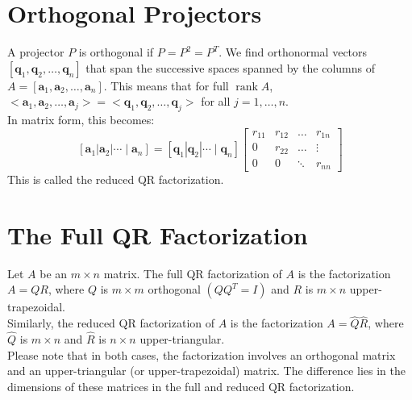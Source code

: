 \documentclass[11pt]{book}
\begin{document}
\section*{Orthogonal Projectors}
A projector $P$ is orthogonal if $P=P^{2}=P^{T}$. We find orthonormal vectors $\left[\mathbf{q}_{1}, \mathbf{q}_{2}, \ldots, \mathbf{q}_{n}\right]$ that span the successive spaces spanned by the columns of $A=\left[\mathbf{a}_{1}, \mathbf{a}_{2}, \ldots, \mathbf{a}_{n}\right]$. This means that for full $\operatorname{rank} A$, $<\mathbf{a}_{1}, \mathbf{a}_{2}, \ldots, \mathbf{a}_{j}>=<\mathbf{q}_{1}, \mathbf{q}_{2}, \ldots, \mathbf{q}_{j}>$ for all $j=1, \ldots, n$.\\
In matrix form, this becomes:
$$\left[\mathbf{a}_1\left|\mathbf{a}_2\right| \cdots \mid \mathbf{a}_n\right]=\left[\mathbf{q}_1\left|\mathbf{q}_2\right| \cdots \mid \mathbf{q}_n\right]\left[\begin{array}{cccc}r_{11} & r_{12} & \ldots & r_{1 n} \\ 0 & r_{22} & \ldots & \vdots \\ 0 & 0 & \ddots & r_{n n}\end{array}\right]$$
This is called the reduced QR factorization.


\section*{The Full QR Factorization}
Let $A$ be an $m \times n$ matrix. The full QR factorization of $A$ is the factorization $A=Q R$, where $Q$ is $m \times m$ orthogonal $\left(Q Q^{T}=I\right)$ and $R$ is $m \times n$ upper-trapezoidal.\\
Similarly, the reduced QR factorization of $A$ is the factorization $A=\hat{Q} \hat{R}$, where $\hat{Q}$ is $m \times n$ and $\hat{R}$ is $n \times n$ upper-triangular. \\
Please note that in both cases, the factorization involves an orthogonal matrix and an upper-triangular (or upper-trapezoidal) matrix. The difference lies in the dimensions of these matrices in the full and reduced QR factorization.
\end{document}
